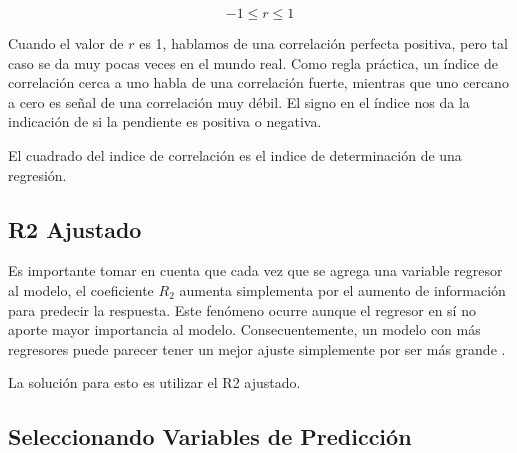 \documentclass[letterpaper, spanish, 11pt]{report}
\begin{document}
\[ -1 \leq r \leq 1\]

Cuando el valor de $r$ es 1, hablamos de una correlación perfecta positiva, pero tal caso se da muy pocas veces en el mundo real. Como regla práctica, un índice de correlación cerca a uno habla de una correlación fuerte, mientras que uno cercano a cero es señal de una correlación muy débil. El signo en el índice nos da la indicación de si la pendiente es positiva o negativa.

El cuadrado del indice de correlación es el indice de determinación de una regresión.

\subsection{R2 Ajustado}
Es importante tomar en cuenta que cada vez que se agrega una variable regresor al modelo, el coeficiente $R_{2}$ aumenta simplementa por el aumento de información para predecir la respuesta. Este fenómeno ocurre aunque el regresor en sí no aporte mayor importancia al modelo. Consecuentemente, un modelo con más regresores puede parecer tener un mejor ajuste simplemente por ser más grande \cite{daroczi}.

La solución para esto es utilizar el R2 ajustado.

\subsection{Seleccionando Variables de Predicción}




\pagebreak

\end{document}
